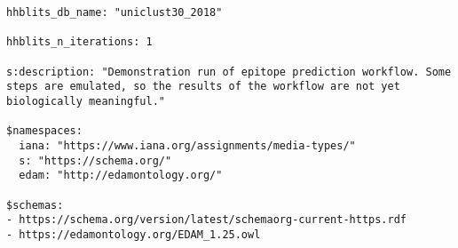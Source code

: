 \begin{verbatim}
hhblits_db_name: "uniclust30_2018"

hhblits_n_iterations: 1

s:description: "Demonstration run of epitope prediction workflow. Some steps are emulated, so the results of the workflow are not yet biologically meaningful."

$namespaces:
  iana: "https://www.iana.org/assignments/media-types/"
  s: "https://schema.org/"
  edam: "http://edamontology.org/"

$schemas:
- https://schema.org/version/latest/schemaorg-current-https.rdf
- https://edamontology.org/EDAM_1.25.owl
\end{verbatim}